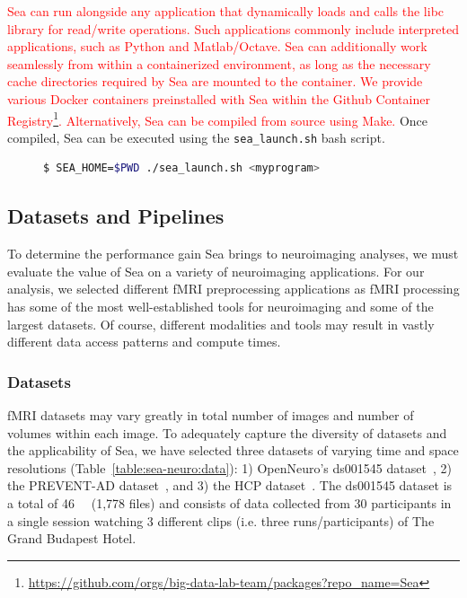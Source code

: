 \documentclass[pdflatex,sn-mathphys-num]{sn-jnl}
\newcommand{\vhs}[1]{\textcolor{red}{#1}}
\theoremstyle{thmstyleone}%
\theoremstyle{thmstyletwo}%
\theoremstyle{thmstylethree}%
\begin{document}
    
    \vhs{Sea can run alongside any application that dynamically loads and calls the libc library for read/write operations. Such applications commonly include interpreted applications, such as Python and Matlab/Octave. Sea can additionally work seamlessly from within a containerized environment, as long as the necessary cache directories required by Sea are mounted to the container. We provide various Docker containers preinstalled with Sea within the Github Container Registry\footnote{\url{https://github.com/orgs/big-data-lab-team/packages?repo_name=Sea}}. Alternatively, Sea can be compiled from source using Make.} Once
    compiled, Sea can be executed using the \texttt{sea\_launch.sh} bash script.
    
        \begin{figure}
      \centering
       \begin{lstlisting}[language=bash,frame=single,
    backgroundcolor=\color{verylightgrey}, caption={Example Sea deployment command}, basicstyle=\ttfamily, label=lst:launch]
        $ SEA_HOME=$PWD ./sea_launch.sh <myprogram>
      \end{lstlisting}
    \end{figure}
    
    \subsection{Datasets and Pipelines}
    
    To determine the performance gain Sea brings to neuroimaging analyses, we
    must evaluate the value of Sea on a variety of neuroimaging applications.
    For our analysis, we selected different fMRI preprocessing applications as
    fMRI processing has some of the most well-established tools for neuroimaging
    and some of the largest datasets. Of course, different modalities and tools
    may result in vastly different data access patterns and compute times.
    
    \subsubsection{Datasets}
    fMRI datasets may vary greatly in total number of images and number of
    volumes within each image. To adequately capture the diversity of datasets
    and the applicability of Sea, we have selected three datasets of varying
    time and space resolutions (Table~\ref{table:sea-neuro:data}): 1)
    OpenNeuro's ds001545 dataset~\cite{ds001545}, 2) the PREVENT-AD
    dataset~\cite{preventad}, and 3) the HCP dataset~\cite{HCP}. The ds001545
    dataset is a total of \SI{46}{\giga\byte} (1,778 files) and consists of data
    collected from 30 participants in a single session watching 3 different
    clips (i.e. three runs/participants) of The Grand Budapest Hotel.
    
\end{document}
